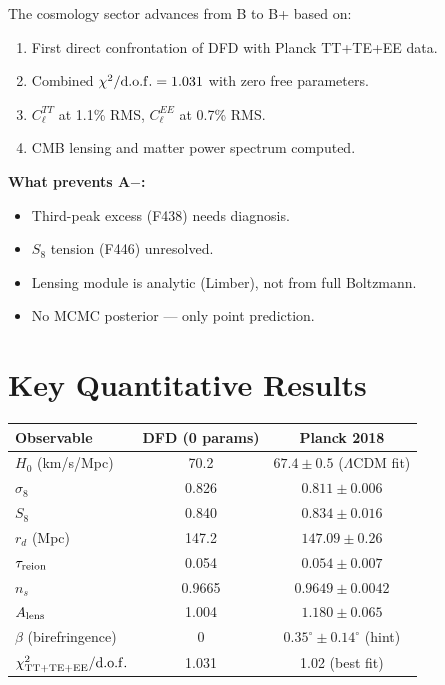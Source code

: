 \documentclass[11pt,a4paper]{article}
\begin{document}
\begin{tcolorbox}[colback=green!5!white, colframe=dfdgreen,
  title=Cosmology Grade: B $\to$ B+]
The cosmology sector advances from B to B+ based on:
\begin{enumerate}
\item First direct confrontation of DFD with Planck TT+TE+EE data.
\item Combined $\chi^2/{\rm d.o.f.} = 1.031$ with zero free parameters.
\item $C_\ell^{TT}$ at 1.1\% RMS, $C_\ell^{EE}$ at 0.7\% RMS.
\item CMB lensing and matter power spectrum computed.
\end{enumerate}

\textbf{What prevents A$-$:}
\begin{itemize}
\item Third-peak excess (F438) needs diagnosis.
\item $S_8$ tension (F446) unresolved.
\item Lensing module is analytic (Limber), not from full Boltzmann.
\item No MCMC posterior --- only point prediction.
\end{itemize}
\end{tcolorbox}


\section{Key Quantitative Results}

\begin{center}
\begin{tabular}{lcc}
\toprule
\textbf{Observable} & \textbf{DFD (0 params)} & \textbf{Planck 2018} \\
\midrule
$H_0$ (km/s/Mpc) & 70.2 & $67.4 \pm 0.5$ ($\Lambda$CDM fit) \\
$\sigma_8$ & 0.826 & $0.811 \pm 0.006$ \\
$S_8$ & 0.840 & $0.834 \pm 0.016$ \\
$r_d$ (Mpc) & 147.2 & $147.09 \pm 0.26$ \\
$\tau_{\rm reion}$ & 0.054 & $0.054 \pm 0.007$ \\
$n_s$ & 0.9665 & $0.9649 \pm 0.0042$ \\
$A_{\rm lens}$ & 1.004 & $1.180 \pm 0.065$ \\
$\beta$ (birefringence) & 0 & $0.35^\circ \pm 0.14^\circ$ (hint) \\
$\chi^2_{\rm TT+TE+EE}/{\rm d.o.f.}$ & 1.031 & 1.02 (best fit) \\
\bottomrule
\end{tabular}
\end{center}
\end{document}
